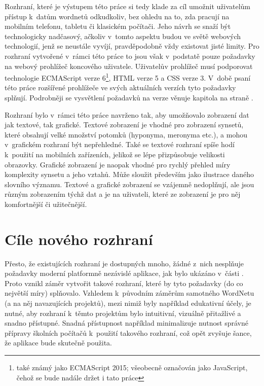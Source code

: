 \documentclass[a4paper,11pt,openany,twoside]{book}
\newcommand{\itNameRef}[1]{\textit{\nameref{#1}}}
\begin{document}
				Rozhraní, které je výstupem této práce si tedy klade za cíl umožnit uživatelům přístup k~datům wordnetů odkudkoliv, bez ohledu na to, zda pracují na mobilním telefonu, tabletu či klasickém počítači. Jeho návrh se snaží být technologicky nadčasový, ačkoliv v~tomto aspektu budou ve světě webových technologií, jenž se neustále vyvíjí, pravděpodobně vždy existovat jisté limity. Pro rozhraní vytvořené v~rámci této práce to jsou však v~podstatě pouze požadavky na webový prohlížeč koncového uživatele. Uživatelův prohlížeč musí podporovat technologie ECMAScript verze 6\footnote{také známý jako ECMAScript 2015; všeobecně označován jako JavaScript, čehož se bude nadále držet i tato práce}, HTML verze 5 a CSS verze 3. V~době psaní této práce rozšířené prohlížeče ve svých aktuálních verzích tyto požadavky splňují. Podrobněji se vysvětlení požadavků na verze věnuje kapitola \itNameRef{cha:techno} na straně \pageref{cha:techno}. 

				Rozhraní bylo v~rámci této práce navrženo tak, aby umožňovalo zobrazení dat jak textové, tak grafické. Textové zobrazení je vhodné pro zobrazení synsetů, které obsahují velké množství potomků (hyponyma, meronyma etc.), a mohou v~grafickém rozhraní být nepřehledné. Také se textové rozhraní spíše hodí k~použití na mobilních zařízeních, jelikož se lépe přizpůsobuje velikosti obrazovky. Grafické zobrazení je naopak vhodné pro rychlý přehled míry komplexity synsetu a jeho vztahů. Může sloužit především jako ilustrace daného slovního významu. Textové a grafické zobrazení se vzájemně nedoplňují, ale jsou různým zobrazením týchž dat a je na uživateli, které ze zobrazení je pro něj komfortnější či užitečnější.

			\section{Cíle nového rozhraní}

				Přesto, že existujících rozhraní je dostupných mnoho, žádné z~nich nesplňuje požadavky moderní platformně nezávislé aplikace, jak bylo ukázáno v~části \itNameRef{part:zwei}. Proto vznikl záměr vytvořit takové rozhraní, které by tyto požadavky (do co největší míry) splňovalo. Vzhledem k~původním záměrům samotného WordNetu (a na něj navazujících projektů), mezi nimiž byly například edukativní účely, je nutné, aby rozhraní k~těmto projektům bylo intuitivní, vizuálně přitažlivé a snadno přístupné. Snadná přístupnost například minimalizuje nutnost správné přípravy školních počítačů k~použití takového rozhraní, což opět zvyšuje šance, že aplikace bude skutečně použita.
\end{document}

